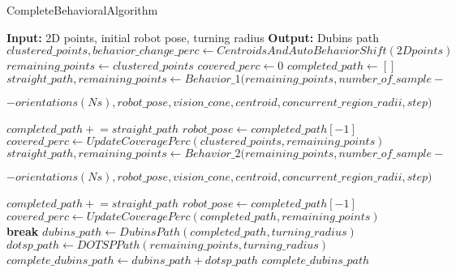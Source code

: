 \begin{algorithm}[H]
    \caption{CompleteBehavioralAlgorithm}
    \begin{algorithmic}[1]
        \Statex \textbf{Input:} 2D points, initial robot pose, turning radius
        \Statex \textbf{Output:} Dubins path
        \newline
        \State $clustered\_points, behavior\_change\_perc \gets CentroidsAndAutoBehaviorShift(2D points)$
        \State $remaining\_points \gets clustered\_points$ 
        \State $covered\_perc \gets 0$
        \State $completed\_path \gets []$
                \State $straight\_path, remaining\_points \gets Behavior\_1(remaining\_points, number\_of\_sample- $ \par
                \hspace{\algorithmicindent} $ -orientations (Ns), robot\_pose, vision\_cone, centroid,concurrent\_region\_radii, step) $ \par

                \State $completed\_path \mathrel{+}= straight\_path$
                \State $robot\_pose \gets completed\_path[-1]$
                \State $covered\_perc \gets UpdateCoveragePerc(clustered\_points, remaining\_points)$
            \Else
                \State $straight\_path, remaining\_points \gets Behavior\_2(remaining\_points, number\_of\_sample- $ \par
                \hspace{\algorithmicindent} $ -orientations (Ns), robot\_pose, vision\_cone, centroid,concurrent\_region\_radii, step) $ \par
                \State $completed\_path \mathrel{+}= straight\_path$
                \State $robot\_pose \gets completed\_path[-1]$
                \State $covered\_perc \gets UpdateCoveragePerc(completed\_path, remaining\_points)$
            \EndIf
                \State \textbf{break}
            \EndIf
        \EndWhile
        \State $dubins\_path \gets DubinsPath(completed\_path, turning\_radius)$
        \State $dotsp\_path \gets DOTSPPath(remaining\_points, turning\_radius)$
        \State $complete\_dubins\_path \gets dubins\_path + dotsp\_path$
        \State \Return $complete\_dubins\_path$
    \end{algorithmic}
\end{algorithm}


